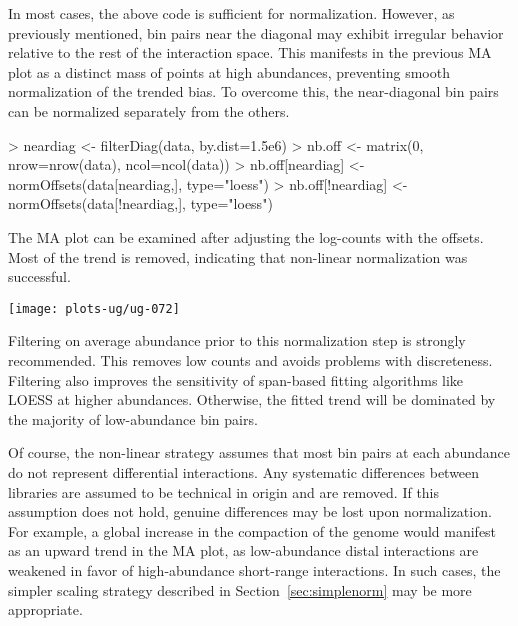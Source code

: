 \documentclass[12pt]{report}
\renewenvironment{Schunk}{\vspace{0pt}}{\vspace{0pt}}
\begin{document}
In most cases, the above code is sufficient for normalization.
However, as previously mentioned, bin pairs near the diagonal may exhibit irregular behavior relative to the rest of the interaction space.
This manifests in the previous MA plot as a distinct mass of points at high abundances, preventing smooth normalization of the trended bias.
To overcome this, the near-diagonal bin pairs can be normalized separately from the others.

\begin{Schunk}
\begin{Sinput}
> neardiag <- filterDiag(data, by.dist=1.5e6)
> nb.off <- matrix(0, nrow=nrow(data), ncol=ncol(data))
> nb.off[neardiag] <- normOffsets(data[neardiag,], type="loess")
> nb.off[!neardiag] <- normOffsets(data[!neardiag,], type="loess")
\end{Sinput}
\end{Schunk}

The MA plot can be examined after adjusting the log-counts with the offsets.
Most of the trend is removed, indicating that non-linear normalization was successful.


\begin{Schunk}
\end{Schunk}

\begin{center}
\texttt{[image: plots-ug/ug-072]}
\end{center}

Filtering on average abundance prior to this normalization step is strongly recommended.
This removes low counts and avoids problems with discreteness.
Filtering also improves the sensitivity of span-based fitting algorithms like LOESS at higher abundances.
Otherwise, the fitted trend will be dominated by the majority of low-abundance bin pairs.

Of course, the non-linear strategy assumes that most bin pairs at each abundance do not represent differential interactions.
Any systematic differences between libraries are assumed to be technical in origin and are removed.
If this assumption does not hold, genuine differences may be lost upon normalization.
For example, a global increase in the compaction of the genome would manifest as an upward trend in the MA plot, as low-abundance distal interactions are weakened in favor of high-abundance short-range interactions.
In such cases, the simpler scaling strategy described in Section~\ref{sec:simplenorm} may be more appropriate.
\end{document}
